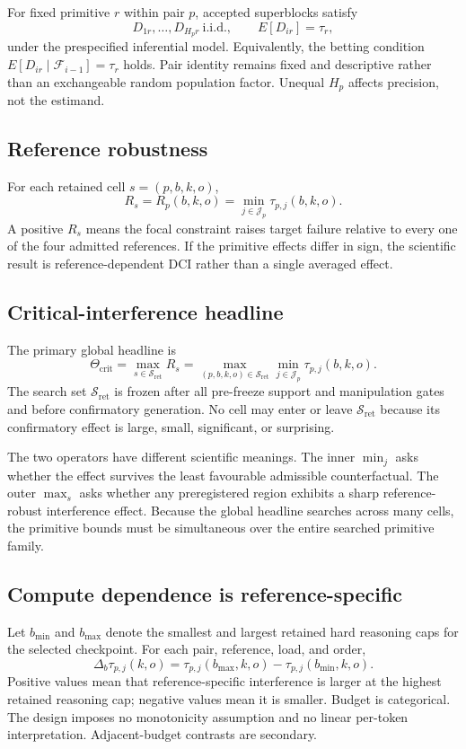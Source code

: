 \documentclass[11pt,a4paper]{article}
\newcommand{\Tcrit}{\Theta_{\mathrm{crit}}}
\newcommand{\Sc}{\mathcal S_{\mathrm{ret}}}
\begin{document}
For fixed primitive $r$ within pair $p$, accepted superblocks satisfy
\[
D_{1r},\ldots,D_{H_pr}\ \text{i.i.d.},\qquad E[D_{ir}]=\tau_r,
\]
under the prespecified inferential model. Equivalently, the betting condition $E[D_{ir}\mid\mathcal F_{i-1}]=\tau_r$ holds. Pair identity remains fixed and descriptive rather than an exchangeable random population factor. Unequal $H_p$ affects precision, not the estimand.

\subsection{Reference robustness}

For each retained cell $s=(p,b,k,o)$,
\[
R_s=R_p(b,k,o)=\min_{j\in\mathcal J_p}\tau_{p,j}(b,k,o).
\]
A positive $R_s$ means the focal constraint raises target failure relative to every one of the four admitted references. If the primitive effects differ in sign, the scientific result is reference-dependent DCI rather than a single averaged effect.

\subsection{Critical-interference headline}

The primary global headline is
\[
\Tcrit
=
\max_{s\in\Sc}R_s
=
\max_{(p,b,k,o)\in\Sc}
\min_{j\in\mathcal J_p}\tau_{p,j}(b,k,o).
\]
The search set $\Sc$ is frozen after all pre-freeze support and manipulation gates and before confirmatory generation. No cell may enter or leave $\Sc$ because its confirmatory effect is large, small, significant, or surprising.

The two operators have different scientific meanings. The inner $\min_j$ asks whether the effect survives the least favourable admissible counterfactual. The outer $\max_s$ asks whether any preregistered region exhibits a sharp reference-robust interference effect. Because the global headline searches across many cells, the primitive bounds must be simultaneous over the entire searched primitive family.

\subsection{Compute dependence is reference-specific}

Let $b_{\min}$ and $b_{\max}$ denote the smallest and largest retained hard reasoning caps for the selected checkpoint. For each pair, reference, load, and order,
\[
\Delta_b\tau_{p,j}(k,o)
=
\tau_{p,j}(b_{\max},k,o)
-
\tau_{p,j}(b_{\min},k,o).
\]
Positive values mean that reference-specific interference is larger at the highest retained reasoning cap; negative values mean it is smaller. Budget is categorical. The design imposes no monotonicity assumption and no linear per-token interpretation. Adjacent-budget contrasts are secondary.
\end{document}
